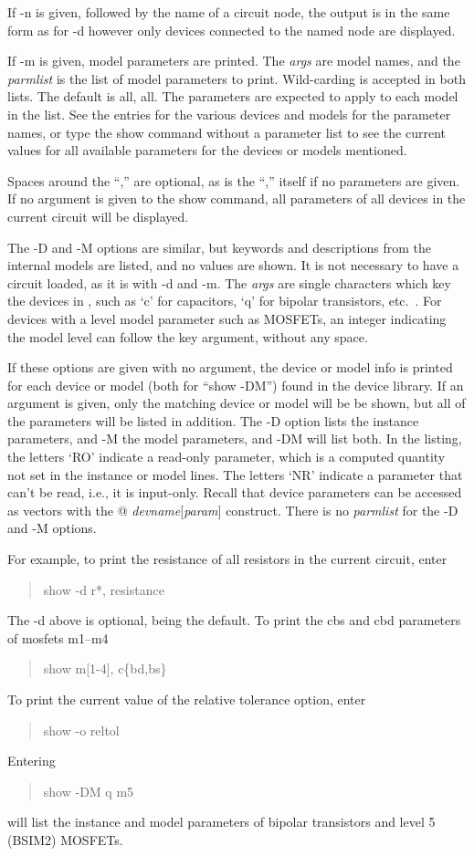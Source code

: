 If {\vt -n} is given, followed by the name of a circuit node, the
output is in the same form as for {\vt -d} however only devices
connected to the named node are displayed.

If {\vt -m} is given, model parameters are printed.  The {\it args}
are model names, and the {\it parmlist} is the list of model
parameters to print.  Wild-carding is accepted in both lists.  The
default is {\vt all, all}.  The parameters are expected to apply to
each model in the list.  See the entries for the various devices and
models for the parameter names, or type the {\cb show} command without
a parameter list to see the current values for all available
parameters for the devices or models mentioned.

Spaces around the ``,'' are optional, as is the ``,'' itself if no
parameters are given.  If no argument is given to the show command,
all parameters of all devices in the current circuit will be
displayed.

The {\vt -D} and {\vt -M} options are similar, but keywords and
descriptions from the internal models are listed, and no values are
shown.  It is not necessary to have a circuit loaded, as it is with
{\vt -d} and {\vt -m}.  The {\it args} are single characters which key
the devices in {\WRspice}, such as `{\vt c}' for capacitors, `{\vt q}'
for bipolar transistors, etc.~.  For devices with a {\vt level} model
parameter such as MOSFETs, an integer indicating the model level can
follow the key argument, without any space.

If these options are given with no argument, the device or model
info is printed for each device or model (both for ``{\vt show
-DM}'') found in the device library.  If an argument is given, only
the matching device or model will be be shown, but all of the
parameters will be listed in addition.  The {\vt -D} option lists
the instance parameters, and {\vt -M} the model parameters, and {\vt
-DM} will list both.  In the listing, the letters `RO' indicate a
read-only parameter, which is a computed quantity not set in the
instance or model lines.  The letters `NR' indicate a parameter that
can't be read, i.e., it is input-only.  Recall that device
parameters can be accessed as vectors with the {\vt @}{\it
devname\/}[{\it param\/}] construct.  There is no {\it parmlist} for
the {\vt -D} and {\vt -M} options.

For example, to print the resistance of all resistors in the current
circuit, enter
\begin{quote}\vt
show -d r*, resistance
\end{quote}
The {\vt -d} above is optional, being the default.  To print the {\vt
cbs} and {\vt cbd} parameters of mosfets {\vt m1}--{\vt m4}
\begin{quote}\vt
show m[1-4], c{\rm \{}bd,bs{\rm \}}
\end{quote}
To print the current value of the relative tolerance option, enter
\begin{quote}\vt
show -o reltol
\end{quote}
Entering
\begin{quote}\vt
show -DM q m5
\end{quote}
will list the instance and model parameters of bipolar transistors and
level 5 (BSIM2) MOSFETs.

